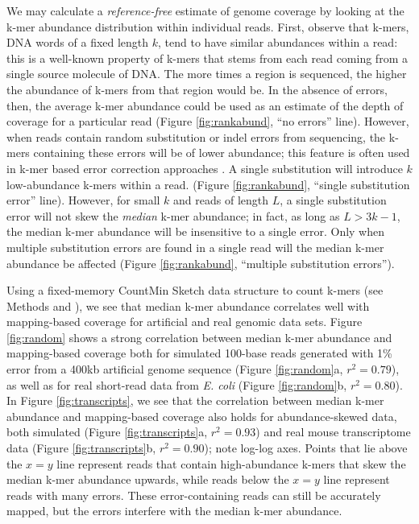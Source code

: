 \documentclass{pnastwo}
\begin{document}
\begin{article}
We may calculate a {\em reference-free} estimate of genome coverage by
looking at the k-mer abundance distribution within individual reads.
First, observe that k-mers, DNA words of a fixed length $k$, tend to
have similar abundances within a read: this is a well-known property
of k-mers that stems from each read coming from a single source
molecule of DNA.  The more times a region is sequenced, the higher the
abundance of k-mers from that region would be.  In the absence of
errors, then, the average k-mer abundance could be used as an estimate
of the depth of coverage for a particular read (Figure
\ref{fig:rankabund}, ``no errors'' line).  However, when reads contain
random substitution or indel errors from sequencing, the k-mers
containing these errors will be of lower abundance; this feature is
often used in k-mer based error correction approaches
\cite{pubmed21114842}.  A single substitution will introduce $k$
low-abundance k-mers within a read.  (Figure \ref{fig:rankabund},
``single substitution error'' line).  However, for small $k$ and reads
of length $L$, a single substitution error will not skew the {\em
  median} k-mer abundance; in fact, as long as $L > 3k-1$, the median
k-mer abundance will be insensitive to a single error.  Only when
multiple substitution errors are found in a single read will the
median k-mer abundance be affected (Figure \ref{fig:rankabund},
``multiple substitution errors'').

Using a fixed-memory CountMin Sketch data structure to count k-mers
(see Methods and \cite{countminsketch}), we see that median k-mer
abundance correlates well with mapping-based coverage for artificial
and real genomic data sets.  Figure \ref{fig:random} shows a strong
correlation between median k-mer abundance and mapping-based coverage
both for simulated 100-base reads generated with 1\% error from a
400kb artificial genome sequence (Figure \ref{fig:random}a, $r^2 =
0.79$), as well as for real short-read data from {\em E. coli} (Figure
\ref{fig:random}b, $r^2 = 0.80$).  In Figure \ref{fig:transcripts}, we
see that the correlation between median k-mer abundance and
mapping-based coverage also holds for abundance-skewed data, both
simulated (Figure \ref{fig:transcripts}a, $r^2 = 0.93$) and real mouse
transcriptome data (Figure \ref{fig:transcripts}b, $r^2 = 0.90$); note
log-log axes.  Points that lie above the $x=y$ line represent reads
that contain high-abundance k-mers that skew the median k-mer
abundance upwards, while reads below the $x=y$ line represent reads
with many errors.  These error-containing reads can still be
accurately mapped, but the errors interfere with the median k-mer
abundance.


\end{article}
\end{document}
